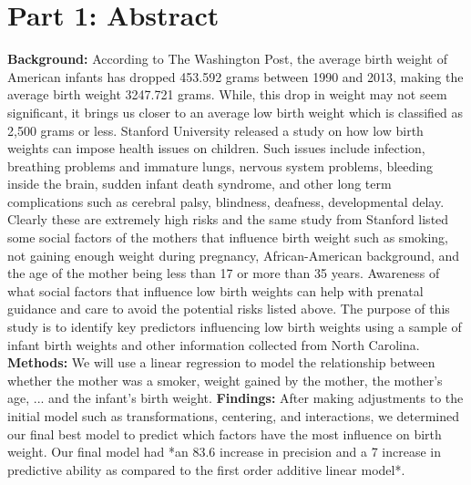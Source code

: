 \documentclass{article}\usepackage[]{graphicx}\usepackage[]{xcolor}
\begin{document}
\section{Part 1: \textbf{Abstract}}
\textbf{Background:} According to The Washington Post, the average birth weight of American infants has dropped 453.592 grams between 1990 and 2013, making the average birth weight 3247.721 grams. While, this drop in weight may not seem significant, it brings us closer to an average low birth weight which is classified as 2,500 grams or less. Stanford University released a study on how low birth weights can impose health issues on children. Such issues include infection, breathing problems and immature lungs, nervous system problems, bleeding inside the brain, sudden infant death syndrome, and other long term complications such as cerebral palsy, blindness, deafness, developmental delay. Clearly these are extremely high risks and the same study from Stanford listed some social factors of the mothers that influence birth weight such as smoking, 
not gaining enough weight during pregnancy, African-American background,  and the age of the mother being less than 17 or more than 35 years. Awareness of what social factors that influence low birth weights can help with prenatal guidance and care to avoid the potential risks listed above. The purpose of this study is to identify key predictors influencing low birth weights using a sample of infant birth weights and other information collected from North Carolina. \textbf{Methods:} We will use a linear regression to model the relationship between whether the mother was a smoker, weight gained by the mother, the mother's age, ... and the infant's birth weight. \textbf{Findings:} After making adjustments to the initial model such as transformations, centering,  and interactions, we determined our final best model to predict which factors have the most influence on birth weight. Our final model had *an 83.6 increase in precision and a 7 increase in predictive ability as compared to the first order additive linear model*.
\end{document}
